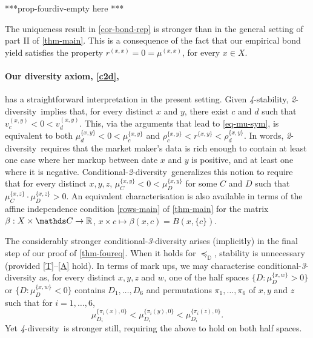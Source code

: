 \documentclass[12pt,a4paper,twoside]{article}
\newcommand{\mbbd}{{\mathds D}}
\newcommand{\mbbc}{{\mathds C}}
\newcommand{\xx}{(x,x)}
\newcommand{\xy}{{(x, y)}}
\newcommand{\stability}{\textit{4}-\textup{{stability}}}
\newcommand{\Condtwodiv}{\textup{Conditional-\textit{2}-diversity}}
\newcommand{\twodiv}{\textit{2}-\textup{diversity}}
\newcommand{\fourdiv}{\textit{4}-\textup{diversity}}
\begin{document}
***prop-fourdiv-empty here ***

The uniqueness result in \cref{cor-bond-rep} is stronger than in the general
setting of part II of \cref{thm-main}. This is a consequence of the fact that
our empirical bond yield satisfies the property $r^{\xx} = 0 = \mu^{\xx}$, for
every $x \in X$. 

\paragraph{Our diversity axiom, \ref{c2d},}\hskip-6pt has a straightforward
interpretation in the present setting. Given \stability, \twodiv\ implies that,
for every distinct $x$ and $y$, there exist $c$ and $d$ such that $v^{\xy}_{c}
< 0 < v^{\xy}_{d}$.  This, via the arguments that lead to \cref{eq-mu-sym}, is
equivalent to both $\mu^{\{x,y\}}_{d} < 0 < \mu^{\{x,y\}}_{c}$ and
$\rho^{\{x,y\}}_{c} < r^{\{x,y\}} < \rho^{\{x,y\}}_{d}$.  In words, \twodiv\
requires that the market maker's data is rich enough to contain at least one
case where her markup between date $x$ and $y$ is positive, and at least one
where it is negative.
\Condtwodiv\ {generalizes} this notion to require that for every distinct $x,
y, z$, $\mu^{\{x,y\}}_{C} < 0 < \mu^{\{x,y\}}_{D}$ for some $C$ and $D$ such
that $\mu^{\{x,z\}}_{C}\cdot \mu^{\{x,z\}}_{D} >0$. An equivalent
characterisation is also available in terms of the affine independence
condition \ref{rows-main} of \cref{thm-main} for the matrix $\beta: X \times
\mbbc \rightarrow \R$, $x\times c \mapsto \beta(x, c) = B(x, \{c\})$.

The considerably stronger conditional-\emph{3}-diversity arises (implicitly) in
the final step of our proof of \cref{thm-foureq}. When it holds for
$\preceq_{\mbbd}$, {stability} is unnecessary (provided \ref{T}--\ref{A} hold).
In terms of mark ups, we may characterise conditional-\emph{3}-diversity as,
for every distinct $x, y, z$ and $w$, one of the half spaces $\{D :
\mu^{\{x,w\}}_D > 0\}$ or $\{D: \mu^{\{x,w\}}_D < 0\}$ contains $D_1, \dots,
D_6$ and permutations $\pi_1, \dots, \pi_6$ of $x, y$ and $z$ such that for
$i=1,\dots,6$, 
\begin{equation*}
  \mu^{\{\pi_i(x),0\}}_{D_i} < \mu^{\{\pi_i(y),0\}}_{D_i} <
  \mu^{\{\pi_i(z),0\}}_{D_i}.
\end{equation*}
Yet \fourdiv\ is stronger still, requiring the above to hold on both half
spaces.
\end{document}
